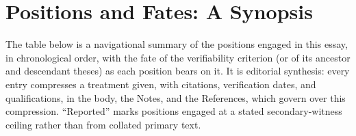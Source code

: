 \section{Positions and Fates: A Synopsis}

The table below is a navigational summary of the positions engaged in this essay, in chronological order, with the fate of the verifiability criterion (or of its ancestor and descendant theses) as each position bears on it. It is editorial synthesis: every entry compresses a treatment given, with citations, verification dates, and qualifications, in the body, the Notes, and the References, which govern over this compression. ``Reported'' marks positions engaged at a stated secondary-witness ceiling rather than from collated primary text.

\begingroup
\renewcommand{\arraystretch}{1.28}
\footnotesize
